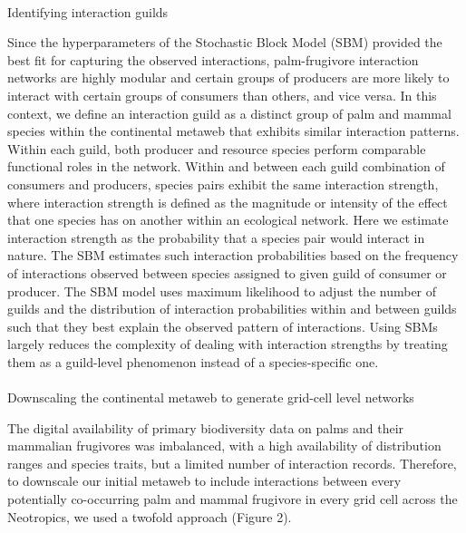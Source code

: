 \documentclass[
]{agujournal2019}
\makeatletter
\let\oldparagraph\paragraph
\renewcommand{\paragraph}{
    \@ifstar
      \xxxParagraphStar
      \xxxParagraphNoStar
  }
\newcommand{\xxxParagraphStar}[1]{\oldparagraph*{#1}\mbox{}}
\newcommand{\xxxParagraphNoStar}[1]{\oldparagraph{#1}\mbox{}}
\makeatother
\begin{document}
\paragraph{Identifying interaction
guilds}\label{identifying-interaction-guilds}

Since the hyperparameters of the Stochastic Block Model (SBM) provided
the best fit for capturing the observed interactions, palm-frugivore
interaction networks are highly modular and certain groups of producers
are more likely to interact with certain groups of consumers than
others, and vice versa. In this context, we define an interaction guild
as a distinct group of palm and mammal species within the continental
metaweb that exhibits similar interaction patterns. Within each guild,
both producer and resource species perform comparable functional roles
in the network. Within and between each guild combination of consumers
and producers, species pairs exhibit the same interaction strength,
where interaction strength is defined as the magnitude or intensity of
the effect that one species has on another within an ecological network.
Here we estimate interaction strength as the probability that a species
pair would interact in nature. The SBM estimates such interaction
probabilities based on the frequency of interactions observed between
species assigned to given guild of consumer or producer. The SBM model
uses maximum likelihood to adjust the number of guilds and the
distribution of interaction probabilities within and between guilds such
that they best explain the observed pattern of interactions. Using SBMs
largely reduces the complexity of dealing with interaction strengths by
treating them as a guild-level phenomenon instead of a species-specific
one.

\paragraph{Downscaling the continental metaweb to generate grid-cell
level
networks}\label{downscaling-the-continental-metaweb-to-generate-grid-cell-level-networks}

The digital availability of primary biodiversity data on palms and their
mammalian frugivores was imbalanced, with a high availability of
distribution ranges and species traits, but a limited number of
interaction records. Therefore, to downscale our initial metaweb to
include interactions between every potentially co-occurring palm and
mammal frugivore in every grid cell across the Neotropics, we used a
twofold approach (Figure 2).
\end{document}
